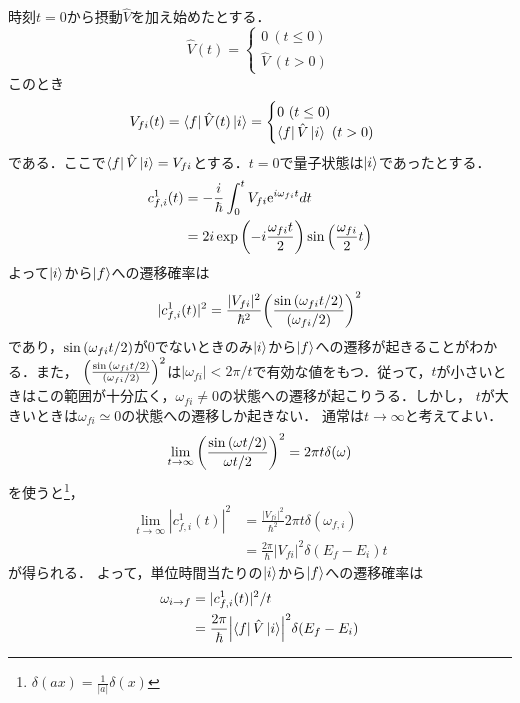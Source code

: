 \documentclass{report}
\begin{document}
  時刻$t=0$から摂動$\hat{V}$を加え始めたとする．
  \begin{equation}
    \hat{V}(t)=
    \begin{cases}
      0\ (t\le0)\\
      \hat{V}\ (t>0)
    \end{cases}
  \end{equation}
  このとき
  \begin{equation}
    V_{fi}(t)=\bra{f}\hat{V}(t)\ket{i}=
    \begin{cases}
      0\ (t\le 0)\\
      \bra{f}\hat{V}\ket{i}\ (t>0)
    \end{cases}
  \end{equation}
  である．ここで$\bra{f}\hat{V}\ket{i}=V_{fi}$とする．$t=0$で量子状態は$\ket{i}$であったとする．
  \begin{align}
    c_{f,i}^1(t)&=-\frac{i}{\hbar}\int_{0}^{t}V_{fi}\mathrm{e}^{i\omega_{fi}t}dt\\
    &=2i\exp\qty(-i\frac{\omega_{fi}t}{2})\sin\qty(\frac{\omega_{fi}}{2}t)
  \end{align}
  よって$\ket{i}$から$\ket{f}$への遷移確率は
  \begin{equation}
    |c_{f,i}^1(t)|^2=\frac{|V_{fi}|^2}{\hbar^2}\qty(\frac{\sin\qty(\omega_{fi}t/2)}{\qty(\omega_{fi}/2)})^2
  \end{equation}
  であり，$\sin\qty(\omega_{fi}t/2)$が0でないときのみ$\ket{i}$から$\ket{f}$への遷移が起きることがわかる．また，
  $\qty(\frac{\sin\qty(\omega_{fi}t/2)}{\qty(\omega_{fi}/2)})^2$は$|\omega_{fi}|<2\pi/t$で有効な値をもつ．従って，$t$が小さいときはこの範囲が十分広く，$\omega_{fi}\ne0$の状態への遷移が起こりうる．しかし，
  $t$が大きいときは$\omega_{fi}\simeq0$の状態への遷移しか起きない．
  通常は$t\to\infty$と考えてよい．
  \begin{equation}
    \lim_{t\to\infty}\qty(\frac{\sin\qty(\omega t/2)}{\omega t/2})^2=2\pi t\delta(\omega)
  \end{equation}
  を使うと\footnote{$\delta(ax)=\frac{1}{|a|}\delta(x)$}，
  \begin{align}
    \lim_{t\to\infty}|c_{f,i}^1(t)|^2&=\frac{|V_{fi}|^2}{\hbar^2}2\pi t\delta(\omega_{f,i})\\
    &=\frac{2\pi}{\hbar}|V_{fi}|^2\delta(E_f-E_i)t
  \end{align}
  が得られる．
  よって，単位時間当たりの$\ket{i}$から$\ket{f}$への遷移確率は
  \begin{align}
    \omega_{i\to f}& = |c_{f,i}^1(t)|^2/t\\
    &=\frac{2\pi}{\hbar}\qty|\bra{f}\hat{V}\ket{i}|^2\delta(E_f-E_i)
  \end{align}
\end{document}
